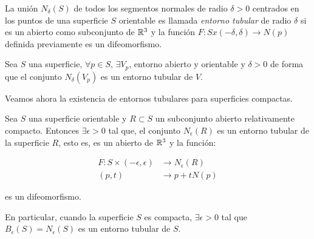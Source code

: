 \begin{definition}
La unión $N_\delta(S)$ de todos los segmentos normales de radio $\delta > 0$ centrados en los puntos de una superficie $S$ orientable es llamada \textit{entorno tubular} de radio $\delta$ si es un abierto como subconjunto de $\mathbb{R}^3$ y la función $F: S x (-\delta, \delta) \longrightarrow N(p)$ definida previamente es un difeomorfismo.
\end{definition}

\begin{lemma}
Sea $S$ una superficie, $\forall p \in S$, $\exists V_p$, entorno abierto y orientable y $\delta > 0$ de forma que el conjunto $N_\delta(V_p)$ es un entorno tubular de $V$.
\end{lemma}

Veamos ahora la existencia de entornos tubulares para superficies compactas.
\begin{theorem}
Sea $S$ una superficie orientable y $R \subset S$ un subconjunto abierto relativamente compacto. Entonces $\exists \epsilon > 0$ tal que, el conjunto $N_\epsilon(R)$ es un entorno tubular de la superficie $R$, esto es, es un abierto de $\mathbb{R}^3$ y la función:

\begin{align*}
    F: S \times (-\epsilon, \epsilon) &\longrightarrow N_\epsilon(R) \\
    (p,t) &\longrightarrow p + tN(p)
\end{align*}

es un difeomorfismo.

En particular, cuando la superficie $S$ es compacta, $\exists \epsilon > 0$ tal que
$B_\epsilon(S)=N_\epsilon(S)$ es un entorno tubular de $S$.
\end{theorem}
